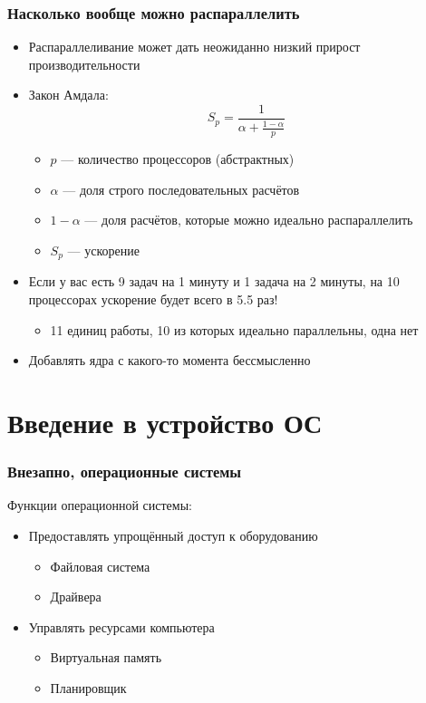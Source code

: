 \documentclass[xetex,mathserif,serif]{beamer}
\begin{document}
    \begin{frame}
        \frametitle{Насколько вообще можно распараллелить}
        \begin{itemize}
            \item Распараллеливание может дать неожиданно низкий прирост производительности
            \item Закон Амдала:
                $$S_p = \frac{1}{\alpha + \frac{1 - \alpha}{p}}$$
            \begin{itemize}
                \item $p$ --- количество процессоров (абстрактных)
                \item $\alpha$ --- доля строго последовательных расчётов
                \item $1 - \alpha$ --- доля расчётов, которые можно идеально распараллелить
                \item $S_p$ --- ускорение
            \end{itemize}
            \item Если у вас есть 9 задач на 1 минуту и 1 задача на 2 минуты, на 10 процессорах ускорение будет всего в 5.5 раз!
            \begin{itemize}
                \item 11 единиц работы, 10 из которых идеально параллельны, одна нет
            \end{itemize}
            \item Добавлять ядра с какого-то момента бессмысленно
        \end{itemize}
    \end{frame}

    \section{Введение в устройство ОС}

    \begin{frame}
        \frametitle{Внезапно, операционные системы}
        Функции операционной системы:
        \begin{itemize}
            \item Предоставлять упрощённый доступ к оборудованию
            \begin{itemize}
                \item Файловая система
                \item Драйвера
            \end{itemize}
            \item Управлять ресурсами компьютера
            \begin{itemize}
                \item Виртуальная память
                \item Планировщик
            \end{itemize}
        \end{itemize}
    \end{frame}
\end{document}
